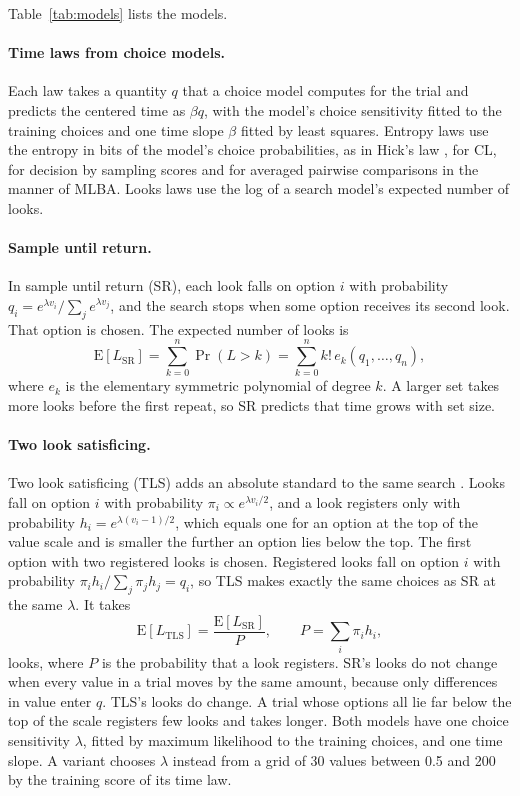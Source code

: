 \documentclass[11pt]{article}
\begin{document}
Table~\ref{tab:models} lists the models.

\paragraph{Time laws from choice models.} Each law takes a quantity $q$ that a choice model computes for the trial and predicts the centered time as $\beta q$, with the model's choice sensitivity fitted to the training choices and one time slope $\beta$ fitted by least squares. Entropy laws use the entropy in bits of the model's choice probabilities, as in Hick's law \citep{hick1952,hyman1953}, for CL, for decision by sampling scores \citep{stewart2006} and for averaged pairwise comparisons in the manner of MLBA. Looks laws use the log of a search model's expected number of looks.

\paragraph{Sample until return.} In sample until return (SR), each look falls on option $i$ with probability $q_i = e^{\lambda v_i} / \sum_j e^{\lambda v_j}$, and the search stops when some option receives its second look. That option is chosen. The expected number of looks is
\begin{equation}
\mathrm{E}[L_{\mathrm{SR}}] = \sum_{k=0}^{n} \Pr(L > k) = \sum_{k=0}^{n} k!\, e_k(q_1, \ldots, q_n),
\end{equation}
where $e_k$ is the elementary symmetric polynomial of degree $k$. A larger set takes more looks before the first repeat, so SR predicts that time grows with set size.

\paragraph{Two look satisficing.} Two look satisficing (TLS) adds an absolute standard to the same search \citep[in the spirit of][]{simon1955}. Looks fall on option $i$ with probability $\pi_i \propto e^{\lambda v_i / 2}$, and a look registers only with probability $h_i = e^{\lambda (v_i - 1)/2}$, which equals one for an option at the top of the value scale and is smaller the further an option lies below the top. The first option with two registered looks is chosen. Registered looks fall on option $i$ with probability $\pi_i h_i / \sum_j \pi_j h_j = q_i$, so TLS makes exactly the same choices as SR at the same $\lambda$. It takes
\begin{equation}
\mathrm{E}[L_{\mathrm{TLS}}] = \frac{\mathrm{E}[L_{\mathrm{SR}}]}{P}, \qquad P = \sum_i \pi_i h_i ,
\end{equation}
looks, where $P$ is the probability that a look registers. SR's looks do not change when every value in a trial moves by the same amount, because only differences in value enter $q$. TLS's looks do change. A trial whose options all lie far below the top of the scale registers few looks and takes longer. Both models have one choice sensitivity $\lambda$, fitted by maximum likelihood to the training choices, and one time slope. A variant chooses $\lambda$ instead from a grid of 30 values between 0.5 and 200 by the training score of its time law.
\end{document}
